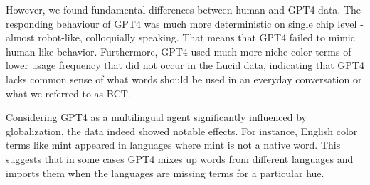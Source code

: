 However, we found fundamental differences between human and GPT4 data. The responding behaviour of GPT4 was much more deterministic on single chip level - almost robot-like, colloquially speaking. That means that GPT4 failed to mimic human-like behavior. Furthermore, GPT4 used much more niche color terms of lower usage frequency that did not occur in the Lucid data, indicating that GPT4 lacks common sense of what words should be used in an everyday conversation or what we referred to as BCT.

Considering GPT4 as a multilingual agent significantly influenced by globalization, the data indeed showed notable effects. For instance, English color terms like mint appeared in languages where mint is not a native word. This suggests that in some cases GPT4 mixes up words from different languages and imports them when the languages are missing terms for a particular hue.





